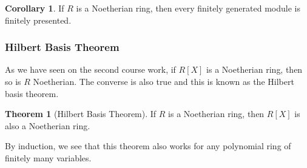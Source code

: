\documentclass[]{article}
\theoremstyle{definition}
\newtheorem{theorem}{Theorem}
\newtheorem{corollary}{Corollary}[theorem]
\theoremstyle{definition}
\begin{document}
\begin{corollary}
  If \(R\) is a Noetherian ring, then every finitely generated module is 
  finitely presented.
\end{corollary}

\subsubsection{Hilbert Basis Theorem}

As we have seen on the second course work, if \(R[X]\) is a Noetherian ring,
then so is \(R\) Noetherian. The converse is also true and this is known as 
the Hilbert basis theorem.

\begin{theorem}[Hilbert Basis Theorem]
  If \(R\) is a Noetherian ring, then \(R[X]\) is also a Noetherian ring.

  By induction, we see that this theorem also works for any polynomial ring of 
  finitely many variables.
\end{theorem}
\end{document}
